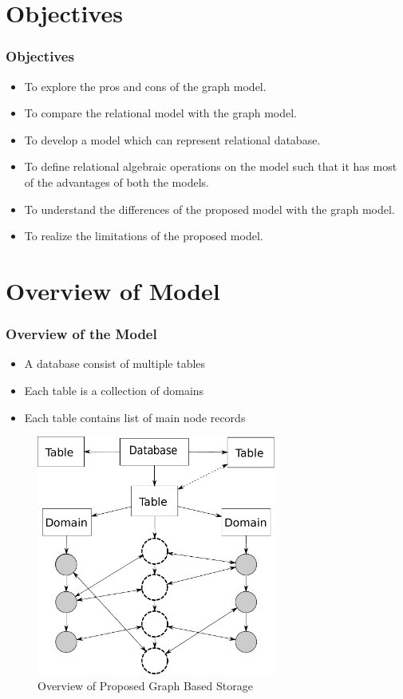 \documentclass[14pt,xcolor=dvipsnames]{beamer}
\begin{document}
\section{Objectives}
\begin{frame}
 \frametitle{Objectives}
 \begin{itemize}
 \item<1-> To explore the pros and cons of the graph model.
 \item<2-> To compare the relational model with the graph model.
 \item<3-> To develop a model which can represent relational database.
 \item<4-> To define relational algebraic operations on the model such that it has most of the advantages of both the models.
 \item<5-> To understand the differences of the proposed model with the graph model.
 \item<6-> To realize the limitations of the proposed model.
 \end{itemize}
\end{frame}

\section{Overview of Model}
\begin{frame}
 \frametitle{Overview of the Model}
 \begin{itemize}
  \item<1-> A database consist of multiple tables
  \item<2-> Each table is a collection of domains
  \item<3-> Each table contains list of main node records
 \end{itemize}
\end{frame}

\begin{frame}
\begin{figure}[t]
 \centering
 \includegraphics[width=0.7\textwidth]{pics/model.pdf}
 \caption{Overview of Proposed Graph Based Storage}
 \label{fig:overview}
\end{figure}
\end{frame}
\end{document}
